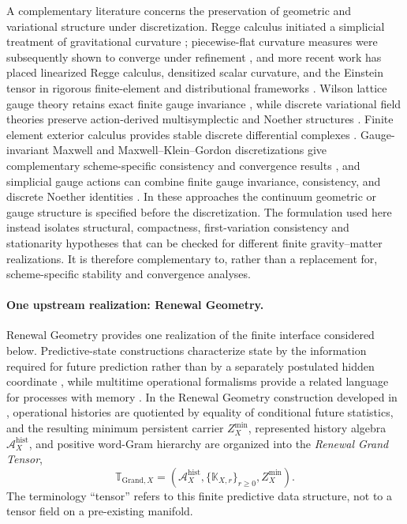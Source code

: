 \documentclass[11pt]{article}
\numberwithin{equation}{section}
\theoremstyle{definition}
\theoremstyle{remark}
\begin{document}
A complementary literature concerns the preservation of geometric and
variational structure under discretization.  Regge calculus initiated a
simplicial treatment of gravitational curvature \cite{Regge1961};
piecewise-flat curvature measures were subsequently shown to converge under
refinement \cite{CheegerMullerSchrader1984}, and more recent work has placed
linearized Regge calculus, densitized scalar curvature, and the Einstein
tensor in rigorous finite-element and distributional frameworks
\cite{ChristiansenRegge2011,ChristiansenRegge2024,
GawlikNeunteufelScalar2025,GawlikNeunteufelEinstein2026}.  Wilson lattice
gauge theory retains exact finite gauge invariance \cite{Wilson1974}, while
discrete variational field theories preserve action-derived multisymplectic
and Noether structures \cite{MarsdenPatrickShkoller1998}.  Finite element
exterior calculus provides stable discrete differential complexes
\cite{ArnoldFalkWinther2006,ArnoldFalkWinther2010}.  Gauge-invariant
Maxwell and Maxwell--Klein--Gordon discretizations give complementary
scheme-specific consistency and convergence results
\cite{ChristiansenHalvorsen2009,ChristiansenHalvorsen2011,
ChristiansenHalvorsenScheid2023}, and simplicial gauge actions can combine
finite gauge invariance, consistency, and discrete Noether identities
\cite{ChristiansenHalvorsen2012}.  In these approaches the continuum
geometric or gauge structure is specified before the discretization.  The
formulation used here instead isolates structural, compactness,
first-variation consistency and stationarity hypotheses that can be checked
for different finite gravity--matter realizations.  It is therefore
complementary to, rather than a replacement for, scheme-specific stability
and convergence analyses.

\paragraph{One upstream realization: Renewal Geometry.}

Renewal Geometry provides one realization of the finite interface considered
below.  Predictive-state constructions characterize state by the information
required for future prediction rather than by a separately postulated hidden
coordinate \cite{ShaliziCrutchfield2001}, while multitime operational
formalisms provide a related language for processes with memory
\cite{ChiribellaEtAl2009,PollockEtAl2018}.  In the Renewal Geometry
construction developed in
\cite{PelissierRenewalSpacetime2026,PelissierSpectral2026}, operational
histories are quotiented by equality of conditional future statistics, and the
resulting minimum persistent carrier
$Z_X^{\min}$, represented history algebra
$\mathcal A_X^{\mathrm{hist}}$, and positive word-Gram hierarchy are organized
into the \emph{Renewal Grand Tensor},
\begin{equation}
\boldsymbol{\mathbb T}_{\mathrm{Grand},X}
=
\left(
\mathcal A_X^{\mathrm{hist}},
\{\mathbb K_{X,r}\}_{r\ge0},
Z_X^{\min}
\right).
\label{eq:intro-grand-tensor}
\end{equation}
The terminology ``tensor'' refers to this finite predictive data structure,
not to a tensor field on a pre-existing manifold.
\end{document}
